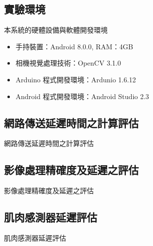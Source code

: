 \documentclass[12pt]{article}  %
\theoremstyle{plain}
\begin{document}
\subsection{實驗環境}
本系統的硬體設備與軟體開發環境
\begin{itemize}
\item 手持裝置：Android 8.0.0, RAM：4GB
\item 相機視覺處理技術：OpenCV 3.1.0
\item Arduino 程式開發環境：Ardunio 1.6.12
\item Android 程式開發環境：Android Studio 2.3
\end{itemize}

\subsection{網路傳送延遲時間之計算評估}
網路傳送延遲時間之計算評估

\subsection{影像處理精確度及延遲之評估}
影像處理精確度及延遲之評估

\subsection{肌肉感測器延遲評估}
肌肉感測器延遲評估
\end{document}
